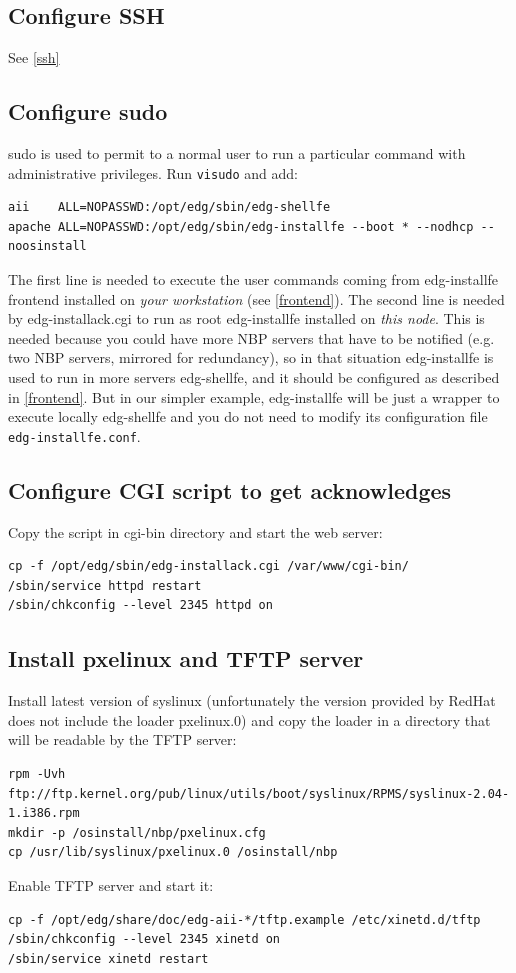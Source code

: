 \documentclass{datagridreport}
\begin{document}
\subsection{Configure SSH} %
See \ref{ssh}

\subsection{Configure sudo} \label{sudo} %
sudo is used to permit to a normal user to run a particular command with administrative
privileges. Run \texttt{visudo} and add:
\begin{verbatim}
aii    ALL=NOPASSWD:/opt/edg/sbin/edg-shellfe
apache ALL=NOPASSWD:/opt/edg/sbin/edg-installfe --boot * --nodhcp --noosinstall
\end{verbatim}

The first line is needed to execute the user commands coming from edg-installfe
frontend installed on \emph{your workstation} (see \ref{frontend}).
The second line is needed by edg-installack.cgi to run as root edg-installfe
installed on \emph{this node}. This is needed because you could have more NBP servers
that have to be notified (e.g. two NBP servers, mirrored for redundancy), so in that
situation edg-installfe is used to run in more servers edg-shellfe, and it should
be configured as described in \ref{frontend}. But in our simpler
example, edg-installfe will be just a wrapper to execute locally edg-shellfe and
you do not need to modify its configuration file \texttt{edg-installfe.conf}.

\subsection{Configure CGI script to get acknowledges} %
Copy the script in cgi-bin directory and start the web server:
\begin{verbatim}
cp -f /opt/edg/sbin/edg-installack.cgi /var/www/cgi-bin/
/sbin/service httpd restart
/sbin/chkconfig --level 2345 httpd on
\end{verbatim}

\subsection{Install pxelinux and TFTP server} %
Install latest version of syslinux (unfortunately the version provided by RedHat does
not include the loader pxelinux.0) and copy the loader in a directory that will be
readable by the TFTP server:
\begin{verbatim}
rpm -Uvh ftp://ftp.kernel.org/pub/linux/utils/boot/syslinux/RPMS/syslinux-2.04-1.i386.rpm
mkdir -p /osinstall/nbp/pxelinux.cfg
cp /usr/lib/syslinux/pxelinux.0 /osinstall/nbp
\end{verbatim}
Enable TFTP server and start it:
\begin{verbatim}
cp -f /opt/edg/share/doc/edg-aii-*/tftp.example /etc/xinetd.d/tftp
/sbin/chkconfig --level 2345 xinetd on
/sbin/service xinetd restart
\end{verbatim}
\end{document}
